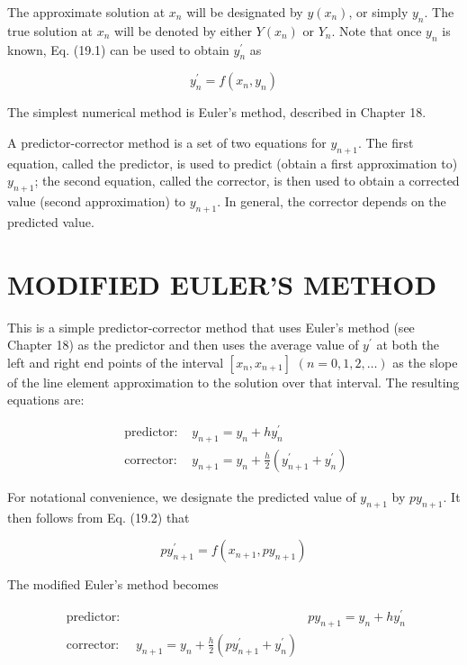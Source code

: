 \documentclass[10pt]{article}
\begin{document}
The approximate solution at $x_{n}$ will be designated by $y\left(x_{n}\right)$, or simply $y_{n}$. The true solution at $x_{n}$ will be denoted by either $Y\left(x_{n}\right)$ or $Y_{n}$. Note that once $y_{n}$ is known, Eq. (19.1) can be used to obtain $y_{n}^{\prime}$ as


\begin{equation*}
y_{n}^{\prime}=f\left(x_{n}, y_{n}\right) \tag{19.2}
\end{equation*}


The simplest numerical method is Euler's method, described in Chapter 18.

A predictor-corrector method is a set of two equations for $y_{n+1}$. The first equation, called the predictor, is used to predict (obtain a first approximation to) $y_{n+1}$; the second equation, called the corrector, is then used to obtain a corrected value (second approximation) to $y_{n+1}$. In general, the corrector depends on the predicted value.

\section*{MODIFIED EULER'S METHOD}
This is a simple predictor-corrector method that uses Euler's method (see Chapter 18) as the predictor and then uses the average value of $y^{\prime}$ at both the left and right end points of the interval $\left[x_{n}, x_{n+1}\right]$ $(n=0,1,2, \ldots)$ as the slope of the line element approximation to the solution over that interval. The resulting equations are:

$$
\begin{array}{ll}
\text { predictor: } & y_{n+1}=y_{n}+h y_{n}^{\prime} \\
\text { corrector: } & y_{n+1}=y_{n}+\frac{h}{2}\left(y_{n+1}^{\prime}+y_{n}^{\prime}\right)
\end{array}
$$

For notational convenience, we designate the predicted value of $y_{n+1}$ by $p y_{n+1}$. It then follows from Eq. (19.2) that


\begin{equation*}
p y_{n+1}^{\prime}=f\left(x_{n+1}, p y_{n+1}\right) \tag{19.3}
\end{equation*}


The modified Euler's method becomes

\[
\begin{array}{ll}
\text { predictor: } & p y_{n+1}=y_{n}+h y_{n}^{\prime} \\
\text { corrector: } \quad y_{n+1}=y_{n}+\frac{h}{2}\left(p y_{n+1}^{\prime}+y_{n}^{\prime}\right) \tag{19.4}
\end{array}
\]
\end{document}
